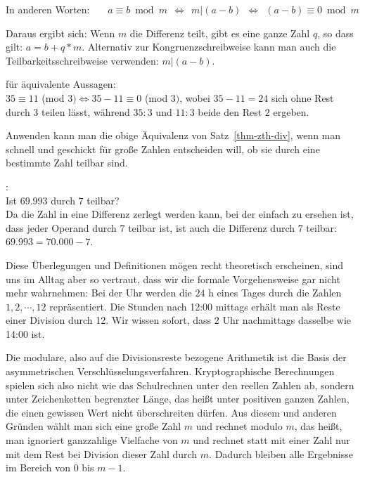 \begin{refsegment}
In anderen Worten:~~~
$ a \equiv b \bmod{m}   ~~ \Longleftrightarrow ~~
  m | (a-b)             ~~ \Longleftrightarrow ~~
  (a-b) \equiv 0 \bmod{m} $


Daraus ergibt sich: Wenn $m$ die Differenz teilt, gibt es eine ganze Zahl $q$, so
dass gilt: $a = b + q*m$.
Alternativ zur Kongruenzschreibweise kann man auch die Teilbarkeitsschreibweise
verwenden: $m | (a - b)$.\\

\begin{example}{ für äquivalente Aussagen:}\\
$35 \equiv 11$ (mod $3) \Longleftrightarrow  35 - 11 \equiv 0$ (mod $3)$,
wobei $35 - 11 = 24$ sich ohne Rest durch $3$ teilen lässt, während $35:3$ und
$11:3$ beide den Rest $2$ ergeben.
\end{example}


Anwenden kann man die obige Äquivalenz von Satz~\ref{thm-zth-div}, wenn man schnell
und geschickt für große Zahlen entscheiden will, ob sie durch eine bestimmte
Zahl teilbar sind.

\begin{example}{:}\\
Ist $69.993$ durch $7$ teilbar?\\
Da die Zahl in eine Differenz zerlegt werden kann, bei der einfach zu ersehen
ist, dass jeder Operand durch $7$ teilbar ist, ist auch die Differenz durch $7$
teilbar: $69.993 = 70.000 - 7$.\\
\end{example}

Diese Überlegungen und Definitionen mögen recht theoretisch erscheinen, sind
uns im Alltag aber so vertraut, dass wir die formale Vorgehensweise gar nicht
mehr wahrnehmen: Bei der Uhr werden die $24$ h eines Tages durch die Zahlen
$1, 2, \cdots, 12$ repräsentiert. Die Stunden nach 12:00 mittags erhält man als
Reste einer Division durch 12. Wir wissen sofort, dass $2$ Uhr nachmittags
dasselbe wie 14:00 ist.

Die \glqq modulare\grqq, also auf die Divisionsreste bezogene Arithmetik ist die
Basis der asymmetrischen Verschlüsselungsverfahren.
Kryptographische Berechnungen spielen sich also nicht wie das Schulrechnen
unter den reellen Zahlen ab, sondern unter Zeichenketten begrenzter Länge,
das heißt unter positiven ganzen Zahlen, die einen gewissen Wert nicht
überschreiten dürfen.
Aus diesem und anderen Gründen wählt man sich eine große Zahl $m$ und \glqq rechnet
modulo $m$\grqq, das heißt, man ignoriert ganzzahlige Vielfache von $m$ und rechnet
statt mit einer Zahl nur mit dem Rest bei Division dieser Zahl durch $m$.
Dadurch bleiben alle Ergebnisse im Bereich von $0$ bis $m-1$.



\end{refsegment}
